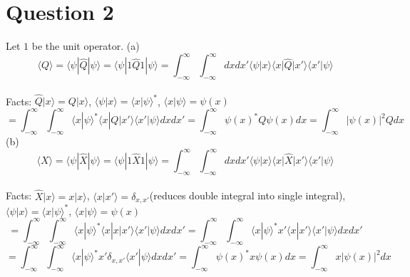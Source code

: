 \documentclass[11pt]{article}
\def\la{\langle}
\def\ra{\rangle}
\def\sp{\vspace{3mm}}
\renewcommand{\hat}{\widehat}
\theoremstyle{pink}
\theoremstyle{boxedsolution}
\theoremstyle{definition}
\theoremstyle{claim}
\begin{document}
 \section*{Question 2}
 Let $1$ be the unit operator.
 (a)\[\la Q\ra=\la\psi|\hat{Q}|\psi\ra=\la\psi|1\hat{Q}1|\psi\ra=\int^\infty_{-\infty}\int^\infty_{-\infty}dxdx'
 \la\psi|x\ra \la x|\hat{Q}|x'\ra \la x'|\psi\ra\]
 \sp
 \\Facts: $\hat{Q}|x\ra=Q|x\ra$, $\la \psi|x\ra=\la x|\psi\ra^*$, $\la x|\psi\ra=\psi(x)$ 
 \sp
 \[=\int^\infty_{-\infty}\int^\infty_{-\infty}\la x|\psi\ra^*\la x|Q|x'\ra \la x'|\psi\ra dxdx'=\int^\infty_{-\infty}\psi(x)^*Q\psi(x)dx=\int^\infty_{-\infty}|\psi(x)|^2Qdx\]
 (b)
\[\la X\ra=\la\psi|\hat{X}|\psi\ra=\la\psi|1\hat{X}1|\psi\ra=\int^\infty_{-\infty}\int^\infty_{-\infty}dxdx'
 \la\psi|x\ra \la x|\hat{X}|x'\ra \la x'|\psi\ra\]
 \sp
 \\Facts: $\hat{X}|x\ra=x|x\ra$, $\la x|x'\ra=\delta_{x,x'}$(reduces double integral into single integral), $\la \psi|x\ra=\la x|\psi\ra^*$, $\la x|\psi\ra=\psi(x)$ 
 \sp
 \[=\int^\infty_{-\infty}\int^\infty_{-\infty}\la x|\psi\ra^*\la x|x|x'\ra \la x'|\psi\ra dxdx'=
 \int^\infty_{-\infty}\int^\infty_{-\infty}\la x|\psi\ra^*x'\la x|x'\ra \la x'|\psi\ra dxdx'
 \]
 \sp
 \[=\int^\infty_{-\infty}\int^\infty_{-\infty}\la x|\psi\ra^*x'\delta_{x,x'} \la x'|\psi\ra dxdx'=
 \int^\infty_{-\infty}\psi(x)^*x\psi(x)dx=\int^\infty_{-\infty}x|\psi(x)|^2dx\]
 
\newpage
\end{document}
